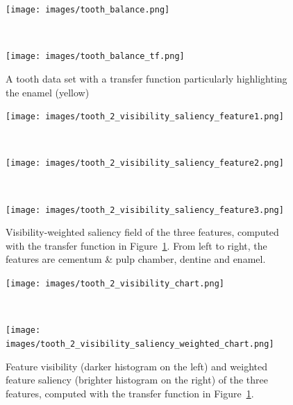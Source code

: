 \begin{figure}
	\centering
	\begin{minipage}{.6\textwidth}
		\texttt{[image: images/tooth\_balance.png]}
	\end{minipage}~
	\begin{minipage}{.3\textwidth}
		\texttt{[image: images/tooth\_balance\_tf.png]}
	\end{minipage}
	\caption{A tooth data set with a transfer function particularly highlighting the enamel (yellow)}
	\label{fig:tooth_2}
\end{figure}

\begin{figure}
	\centering
	\begin{minipage}{.3\textwidth}
		\texttt{[image: images/tooth\_2\_visibility\_saliency\_feature1.png]}
	\end{minipage}~
	\begin{minipage}{.3\textwidth}
		\texttt{[image: images/tooth\_2\_visibility\_saliency\_feature2.png]}
	\end{minipage}~
	\begin{minipage}{.3\textwidth}
		\texttt{[image: images/tooth\_2\_visibility\_saliency\_feature3.png]}
	\end{minipage}
	\caption{Visibility-weighted saliency field of the three features, computed with the transfer function in Figure~\ref{fig:tooth_2}. From left to right, the features are cementum \& pulp chamber, dentine and enamel.}
	\label{fig:tooth_saliency_field_2}
\end{figure}

\begin{figure}
	\centering
	\begin{minipage}{.45\textwidth}
		\texttt{[image: images/tooth\_2\_visibility\_chart.png]}
	\end{minipage}~
	\begin{minipage}{.45\textwidth}
		\texttt{[image: images/tooth\_2\_visibility\_saliency\_weighted\_chart.png]}
	\end{minipage}
	\caption{Feature visibility (darker histogram on the left) and weighted feature saliency (brighter histogram on the right) of the three features, computed with the transfer function in Figure~\ref{fig:tooth_2}.}
	\label{fig:tooth_saliency_chart_2}
\end{figure}

